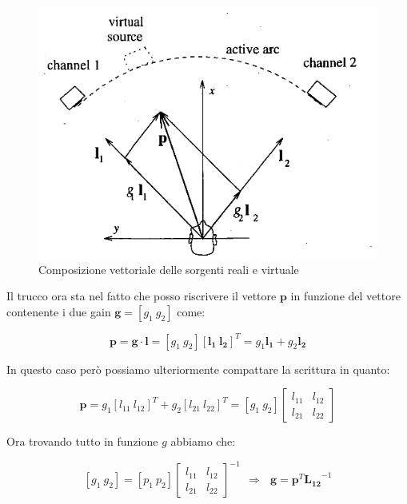 \documentclass[12pt,a4paper]{report}
\begin{document}
\begin{itemize}
\begin{figure}[htbp]
	\centering
	\includegraphics[scale=0.48]{figures/matrix2d.png}
	\caption {Composizione vettoriale delle sorgenti reali e virtuale}
	\label{fig:vettori2d}
	\end{figure}

Il trucco ora sta nel fatto che posso riscrivere il vettore $\boldsymbol{p}$ in funzione del vettore contenente i due gain $\boldsymbol{g}= \left[ g_1 \ g_2 \right]$ come:

\begin{equation}
\boldsymbol{p}= \boldsymbol{g} \cdot \boldsymbol{l} = \left[g_1 \ g_2 \right] \left[\boldsymbol{l_{1}} \ \boldsymbol{l_{2}} \right]^T = g_1 \boldsymbol{l_{1}} + g_2 \boldsymbol{l_{2}}
\label{eq:bbbb}
\end{equation}

In questo caso però possiamo ulteriormente compattare la scrittura in quanto:

\begin{equation}
\boldsymbol{p}=g_1 {\left[ l_{11} \ l_{12} \right]}^T + g_2 {\left[ l_{21} \ l_{22} \right]}^T= \left[ g_1 \ g_2 \right] \left[\begin{matrix}
l_{11} & l_{12}\\ l_{21} & l_{22}
\end{matrix} \right]
\label{eq:cccc}
\end{equation}

Ora trovando tutto in funzione $g$ abbiamo che:

\begin{equation}
\left[g_1 \ g_2\right] = \left[ p_1 \ p_2 \right]  {\left[\begin{matrix}
l_{11} & l_{12}\\ l_{21} & l_{22}
\end{matrix} \right]}^{-1} \ \ \Rightarrow \ \ \ \boldsymbol{g}=\boldsymbol{p}^T {\boldsymbol{L_{12}}}^{-1}
\label{eq:dddd}
\end{equation}


\end{itemize}
\end{document}
